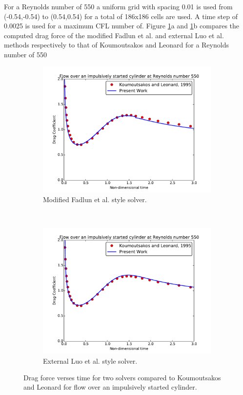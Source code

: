 \documentclass[onehalf,11pt]{beavtex}
\begin{document}
For a Reynolds number of 550 a uniform grid with spacing 0.01 is used from (-0.54,-0.54) to (0.54,0.54) for a total of 186x186 cells are used.
A time step of 0.0025 is used for a maximum CFL number of.
Figure \ref{fig:cy550}a and \ref{fig:cy550}b compares the computed drag force of the modified Fadlun et al. and external Luo et al. methods respectively to that of Koumoutsakos and Leonard for a Reynolds number of 550
\begin{figure}[htb]
	\centering
	\begin{subfigure}{0.4\textwidth}
		\includegraphics[width=\linewidth]{cy550fadlun}
		\caption{Modified Fadlun et al. style solver.}
	\end{subfigure}
	~
	\begin{subfigure}{0.4\textwidth}
		\includegraphics[width=\linewidth]{cy550luo}
		\caption{External Luo et al. style solver.}
	\end{subfigure}
	\caption{Drag force verses time for two solvers compared to Koumoutsakos and Leonard for flow over an impulsively started cylinder.}
	\label{fig:cy550}
\end{figure}
\end{document}
